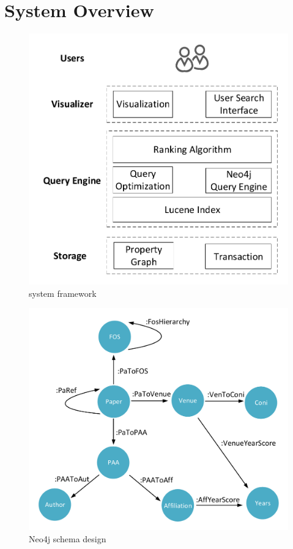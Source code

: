 \section{System Overview}
\label{sec-system}

\begin{figure}
\centering
\includegraphics[width=\columnwidth]{systemFrame.pdf}
\caption{system framework}
\label{fig:frame}
\end{figure}


\begin{figure}
\centering
\includegraphics[width=\columnwidth]{neo4jSchema.pdf}
\caption{Neo4j schema design}
\label{fig:schema}
\end{figure}

